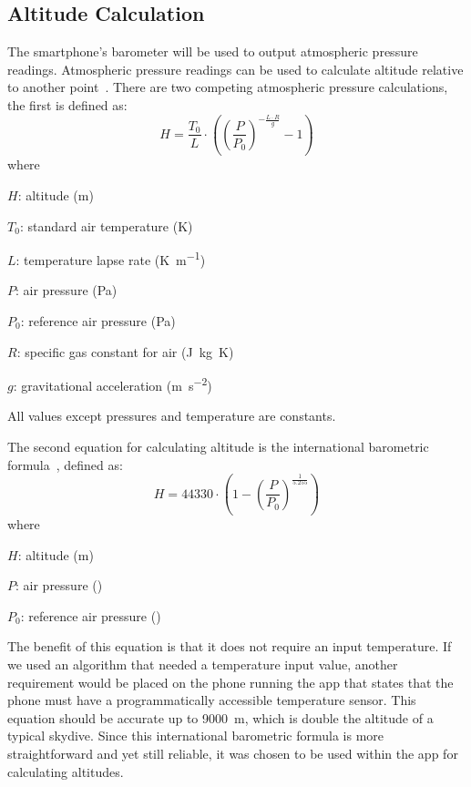 \subsection{Altitude Calculation}\label{subsec:altitude-calc-design}
The smartphone's barometer will be used to output atmospheric pressure readings. Atmospheric pressure readings can be used to calculate altitude relative to another point~\cite{he_atmospheric_2012, liu_beyond_2014}. There are two competing atmospheric pressure calculations, the first is defined as:
\begin{equation}\label{eq:altitude-calculation}
  H = \frac{T_0}{L} \cdot \left({\left(\frac{P}{P_0}\right)}^{-\frac{L \cdot R}{g}} - 1\right)
\end{equation}
where
\begin{description}
  \item $H$: altitude (\si{\metre})
  \item $T_0$: standard air temperature (\si{\kelvin})
  \item $L$: temperature lapse rate (\si{\kelvin\per\metre})
  \item $P$: air pressure (\si{\pascal})
  \item $P_0$: reference air pressure (\si{\pascal})
  \item $R$: specific gas constant for air (\si{\joule\kilogram\kelvin})
  \item $g$: gravitational acceleration (\si{\metre\per\second\squared})
\end{description}

All values except pressures and temperature are constants.

The second equation for calculating altitude is the international barometric formula~\cite{bosch_bmp180:_2018}, defined as:
\begin{equation}\label{eq:barometric-fomula}
  H = 44330 \cdot \left(1 - {\left(\frac{P}{P_0}\right)}^{\frac{1}{5.255}}\right)
\end{equation}
where
\begin{description}
  \item $H$: altitude (\si{\metre})
  \item $P$: air pressure (\si{\hPa})
  \item $P_0$: reference air pressure (\si{\hPa})
\end{description}

The benefit of this equation is that it does not require an input temperature. If we used an algorithm that needed a temperature input value, another requirement would be placed on the phone running the app that states that the phone must have a programmatically accessible temperature sensor. This equation should be accurate up to \SI{9000}{\metre}, which is double the altitude of a typical skydive. Since this international barometric formula is more straightforward and yet still reliable, it was chosen to be used within the app for calculating altitudes.

